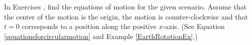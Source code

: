 {\noindent In Exercises}
{, find the equations of motion for the given scenario.  Assume that the center of the motion is the origin, the motion is counter-clockwise and that $t = 0$ corresponds to a position along the positive $x$-axis.  (See Equation \ref{equationsforcircularmotion} and Example \ref{EarthRotationEx}.)}

